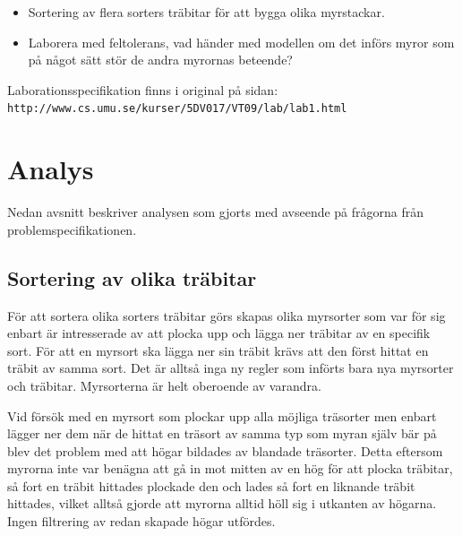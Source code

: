 \documentclass[titlepage, a4paper, 12pt]{article}
\begin{document}
\begin{itemize}
\item Sortering av flera sorters träbitar för att bygga olika
  myrstackar.
\item Laborera med feltolerans, vad händer med modellen om det införs
  myror som på något sätt stör de andra myrornas beteende?
\end{itemize}

Laborationsspecifikation finns i original på sidan:\\
\verb!http://www.cs.umu.se/kurser/5DV017/VT09/lab/lab1.html!

\section{Analys}
Nedan avsnitt beskriver analysen som gjorts med avseende på frågorna
från problemspecifikationen.

\subsection{Sortering av olika träbitar}

För att sortera olika sorters träbitar görs skapas olika myrsorter som
var för sig enbart är intresserade av att plocka upp och lägga ner
träbitar av en specifik sort. För att en myrsort ska lägga ner sin
träbit krävs att den först hittat en träbit av samma sort. Det är
alltså inga ny regler som införts bara nya myrsorter och
träbitar. Myrsorterna är helt oberoende av varandra.

Vid försök med en myrsort som plockar upp alla möjliga träsorter men
enbart lägger ner dem när de hittat en träsort av samma typ som myran
själv bär på blev det problem med att högar bildades av blandade
träsorter. Detta eftersom myrorna inte var benägna att gå in mot
mitten av en hög för att plocka träbitar, så fort en träbit hittades
plockade den och lades så fort en liknande träbit hittades, vilket
alltså gjorde att myrorna alltid höll sig i utkanten av högarna. Ingen
filtrering av redan skapade högar utfördes.
\end{document}
